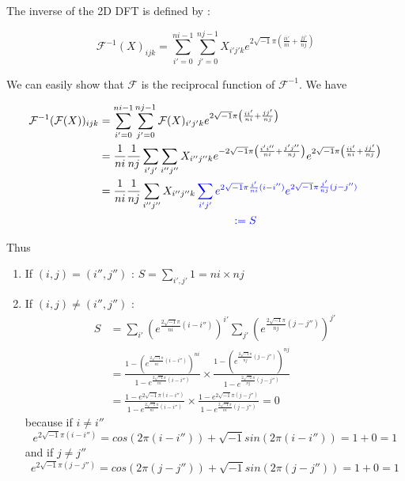 The inverse of the 2D DFT is defined by :

\begin{equation*}
\mathcal{F}^{-1}(X)_{ijk}=\sum_{i'=0}^{ni-1}\sum_{j'=0}^{nj-1}X_{i'j'k}e^{2\sqrt{-1}\pi\left(\frac{ii'}{ni}+\frac{jj'}{nj}\right)}
\end{equation*}

We can easily show that $\mathcal{F}$ is the reciprocal function of $\mathcal{F}^{-1}$. We have 

\begin{align*}
	\mathcal{F}^{-1}(\mathcal{F}(X))_{ijk}&=\sum_{i'=0}^{ni-1}\sum_{j'=0}^{nj-1}\mathcal{F}(X)_{i'j'k}e^{2\sqrt{-1}\pi\left(\frac{ii'}{ni}+\frac{jj'}{nj}\right)} \\	
	&=\frac{1}{ni}\frac{1}{nj}\sum_{i'j'}\sum_{i''j''}X_{i''j''k}e^{-2\sqrt{-1}\pi\left(\frac{i'i''}{ni}+\frac{j'j''}{nj}\right)}e^{2\sqrt{-1}\pi\left(\frac{ii'}{ni}+\frac{jj'}{nj}\right)} \\
	&=\frac{1}{ni}\frac{1}{nj}\sum_{i''j''}X_{i''j''k}\color{blue}\sum_{i'j'}e^{2\sqrt{-1}\pi\frac{i'}{ni}(i-i'')}e^{2\sqrt{-1}\pi\frac{j'}{nj}(j-j'')}\color{black}\\
	& \qquad \qquad \qquad \qquad \qquad \qquad\color{blue}:= S \color{black}
\end{align*}

Thus
\begin{enumerate}[label=\textbullet]
	\item If $(i,j)=(i'',j'')$ : $S=\sum_{i',j'}1=ni\times nj$
	\item If $(i,j)\ne(i'',j'')$ : 
	\begin{align*}
		S&=\sum_{i'}\left(e^{\frac{2\sqrt{-1}\pi}{ni}(i-i'')}\right)^{i'}\sum_{j'}\left(e^{\frac{2\sqrt{-1}\pi}{nj}(j-j'')}\right)^{j'} \\
		&=\frac{1-\left(e^{\frac{2\sqrt{-1}\pi}{ni}(i-i'')}\right)^{ni}}{1-e^{\frac{2\sqrt{-1}\pi}{ni}(i-i'')}}\times \frac{1-\left(e^{\frac{2\sqrt{-1}\pi}{nj}(j-j'')}\right)^{nj}}{1-e^{\frac{2\sqrt{-1}\pi}{nj}(j-j'')}} \\
		&=\frac{1-e^{2\sqrt{-1}\pi(i-i'')}}{1-e^{\frac{2\sqrt{-1}\pi}{ni}(i-i'')}}\times \frac{1-e^{2\sqrt{-1}\pi(j-j'')}}{1-e^{\frac{2\sqrt{-1}\pi}{ni}(j-j'')}}=0
	\end{align*}
	because if $i\ne i''$
	$$e^{2\sqrt{-1}\pi(i-i'')}=cos(2\pi(i-i''))+\sqrt{-1}sin(2\pi(i-i'')) = 1+0 =1$$
	and if $j\ne j''$
	$$e^{2\sqrt{-1}\pi(j-j'')}=cos(2\pi(j-j''))+\sqrt{-1}sin(2\pi(j-j'')) = 1+0 =1$$
\end{enumerate}

